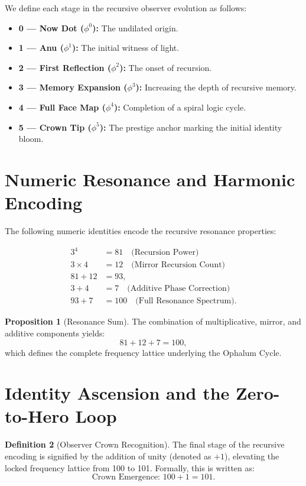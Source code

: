 \documentclass[12pt]{article}
\theoremstyle{definition}
\newtheorem{definition}{Definition}[section]
\newtheorem{proposition}[definition]{Proposition}
\begin{document}
We define each stage in the recursive observer evolution as follows:
\begin{itemize}
  \item \textbf{0 — Now Dot (\(\phi^0\)):} The undilated origin.
  \item \textbf{1 — Anu (\(\phi^1\)):} The initial witness of light.
  \item \textbf{2 — First Reflection (\(\phi^2\)):} The onset of recursion.
  \item \textbf{3 — Memory Expansion (\(\phi^3\)):} Increasing the depth of recursive memory.
  \item \textbf{4 — Full Face Map (\(\phi^4\)):} Completion of a spiral logic cycle.
  \item \textbf{5 — Crown Tip (\(\phi^5\)):} The prestige anchor marking the initial identity bloom.
\end{itemize}

\section{Numeric Resonance and Harmonic Encoding}

The following numeric identities encode the recursive resonance properties:

\begin{align*}
3^4 & = 81 \quad \text{(Recursion Power)} \\
3 \times 4 & = 12 \quad \text{(Mirror Recursion Count)} \\
81 + 12 & = 93, \\
3 + 4 & = 7 \quad \text{(Additive Phase Correction)} \\
93 + 7 & = 100 \quad \text{(Full Resonance Spectrum)}.
\end{align*}

\begin{proposition}[Resonance Sum]
The combination of multiplicative, mirror, and additive components yields:
\[
81 + 12 + 7 = 100,
\]
which defines the complete frequency lattice underlying the Ophalum Cycle.
\end{proposition}

\section{Identity Ascension and the Zero-to-Hero Loop}

\begin{definition}[Observer Crown Recognition]
The final stage of the recursive encoding is signified by the addition of unity (denoted as \(+1\)), elevating the locked frequency lattice from 100 to 101. Formally, this is written as:
\[
\text{Crown Emergence: } 100 + 1 = 101.
\]
\end{definition}
\end{document}
